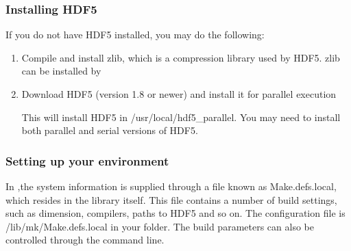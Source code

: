 \documentclass[letterpaper,10pt,english]{sphinxmanual}
\begin{document}
\subsubsection{Installing HDF5}
\label{\detokenize{GettingStarted:installing-hdf5}}\label{\detokenize{GettingStarted:chap-hdf5}}
If you do not have HDF5 installed, you may do the following:
\begin{enumerate}
%
\item {} 
Compile and install zlib, which is a compression library used by HDF5. zlib can be installed by

\begin{sphinxVerbatim}[commandchars=\\\{\},formatcom=\scriptsize]
   
\end{sphinxVerbatim}

\item {} 
Download HDF5 (version 1.8 or newer) and install it for parallel execution

\begin{sphinxVerbatim}[commandchars=\\\{\},formatcom=\scriptsize]
    
 
\end{sphinxVerbatim}

This will install HDF5 in /usr/local/hdf5\_parallel.
You may need to install both parallel and serial versions of HDF5.

\end{enumerate}


\subsubsection{Setting up your environment}
\label{\detokenize{GettingStarted:setting-up-your-environment}}\label{\detokenize{GettingStarted:chap-environment}}
In ,the system information is supplied through a file known as Make.defs.local, which resides in the  library itself.
This file contains a number of build settings, such as dimension, compilers, paths to HDF5 and so on.
The configuration file is /lib/mk/Make.defs.local in your  folder.
The build parameters can also be controlled through the command line.
\end{document}
